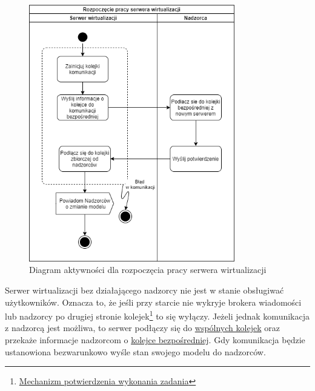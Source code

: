 \documentclass[../opis-rozwiazania.tex]{subfiles}
\begin{document}
\begin{figure}[H]
    \centering
    \includegraphics[width=0.8\textwidth]{../diagrams/activity_diagrams/serwer_start.png}
    \caption{Diagram aktywności dla rozpoczęcia pracy serwera wirtualizacji}
    \label{start_virtsrv}
\end{figure}

Serwer wirtualizacji bez działającego nadzorcy nie jest w stanie obsługiwać użytkowników.
Oznacza to, że jeśli przy starcie nie wykryje brokera wiadomości
lub nadzorcy po drugiej stronie kolejek\footnote{\href{https://www.rabbitmq.com/confirms.html}{Mechanizm potwierdzenia wykonania zadania}} to się wyłączy.
Jeżeli jednak komunikacja z nadzorcą jest możliwa, to serwer podłączy się do \hyperref[modules:broker:queue-virtsrv]{wspólnych kolejek}
oraz przekaże informacje nadzorcom o \hyperref[modules:broker:queue-exclusive]{kolejce bezpośredniej}.
Gdy komunikacja będzie ustanowiona bezwarunkowo wyśle stan swojego modelu do nadzorców.
\end{document}
